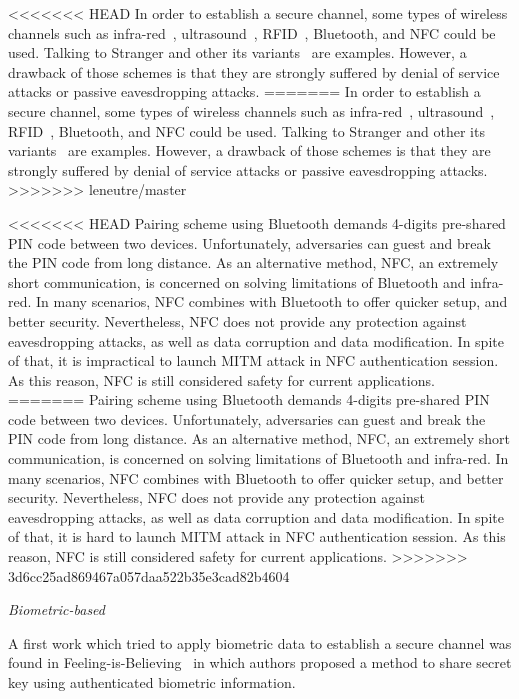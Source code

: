 <<<<<<< HEAD
In order to establish a secure channel, some types of wireless channels such as infra-red~\cite{5654588}, ultrasound~\cite{Mayrhofer06anauthentication}, RFID~\cite{Amariucai:2012aa}, Bluetooth, and NFC could be used. Talking to Stranger and other its variants~\cite{5654588,Mayrhofer06anauthentication,4159919,Amariucai:2012aa} are examples. However, a drawback of those schemes is that they are strongly suffered by denial of service attacks or passive eavesdropping attacks.
=======
In order to establish a secure channel, some types of wireless channels such as infra-red~\cite{5654588}, ultrasound~\cite{Mayrhofer06anauthentication}, RFID~\cite{Amariucai:2012aa}, Bluetooth, and NFC could be used. Talking to Stranger and other its variants~\cite{5654588,Mayrhofer06anauthentication,4159919,Amariucai:2012aa} are examples. However, a drawback of those schemes is that they are strongly suffered by denial of service attacks or passive eavesdropping attacks. 
>>>>>>> leneutre/master

<<<<<<< HEAD
Pairing scheme using Bluetooth demands 4-digits pre-shared PIN code between two devices. Unfortunately, adversaries can guest and break the PIN code from long distance. As an alternative method, NFC, an extremely short communication, is concerned on solving limitations of Bluetooth and infra-red. In many scenarios, NFC combines with Bluetooth to offer quicker setup, and better security. Nevertheless, NFC does not provide any protection against eavesdropping attacks, as well as data corruption and data modification. In spite of that, it is impractical to launch MITM attack in NFC authentication session. As this reason, NFC is still considered safety for current applications. 
=======
Pairing scheme using Bluetooth demands 4-digits pre-shared PIN code between two devices. Unfortunately, adversaries can guest and break the PIN code from long distance. As an alternative method, NFC, an extremely short communication, is concerned on solving limitations of Bluetooth and infra-red. In many scenarios, NFC combines with Bluetooth to offer quicker setup, and better security. Nevertheless, NFC does not provide any protection against eavesdropping attacks, as well as data corruption and data modification. In spite of that, it is hard to launch MITM attack in NFC authentication session. As this reason, NFC is still considered safety for current applications. 
>>>>>>> 3d6cc25ad869467a057daa522b35e3cad82b4604

\emph{Biometric-based}

A first work which tried to apply biometric data to establish a secure channel was found in Feeling-is-Believing~\cite{Buhan_feelingis} in which authors proposed a method to share secret key using authenticated biometric information. 

